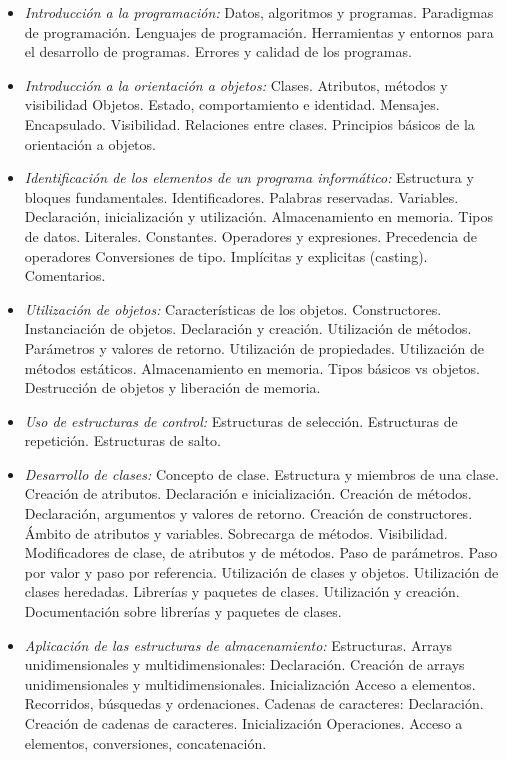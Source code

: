 \begin{itemize}[itemsep=0.1em, topsep=0.1em]
\item\emph{Introducción a la programación:}
Datos, algoritmos y programas.
Paradigmas de programación.
Lenguajes de programación.
Herramientas y entornos para el desarrollo de programas.
Errores y calidad de los programas.
\item\emph{Introducción a la orientación a objetos:}
Clases. Atributos, métodos y visibilidad
Objetos. Estado, comportamiento e identidad. Mensajes.
Encapsulado. Visibilidad.
Relaciones entre clases.
Principios básicos de la orientación a objetos.
\item\emph{Identificación de los elementos de un programa informático:}
Estructura y bloques fundamentales.
Identificadores.
Palabras reservadas.
Variables. Declaración, inicialización y utilización. Almacenamiento en memoria.
Tipos de datos.
Literales.
Constantes.
Operadores y expresiones. Precedencia de operadores
Conversiones de tipo. Implícitas y explicitas (casting).
Comentarios.
\item\emph{Utilización de objetos:}
Características de los objetos.
Constructores.
Instanciación de objetos. Declaración y creación.
Utilización de métodos. Parámetros y valores de retorno.
Utilización de propiedades.
Utilización de métodos estáticos.
Almacenamiento en memoria. Tipos básicos vs objetos.
Destrucción de objetos y liberación de memoria.
\item\emph{Uso de estructuras de control:}
Estructuras de selección.
Estructuras de repetición.
Estructuras de salto.
\item\emph{Desarrollo de clases:}
Concepto de clase.
Estructura y miembros de una clase.
Creación de atributos. Declaración e inicialización.
Creación de métodos. Declaración, argumentos y valores de retorno.
Creación de constructores.
Ámbito de atributos y variables.
Sobrecarga de métodos.
Visibilidad. Modificadores de clase, de atributos y de métodos.
Paso de parámetros. Paso por valor y paso por referencia.
Utilización de clases y objetos.
Utilización de clases heredadas.
Librerías y paquetes de clases. Utilización y creación.
Documentación sobre librerías y paquetes de clases.
\item\emph{Aplicación de las estructuras de almacenamiento:}
Estructuras.
Arrays unidimensionales y multidimensionales:  Declaración.  Creación de arrays unidimensionales y multidimensionales.  Inicialización  Acceso a elementos.  Recorridos, búsquedas y ordenaciones.
Cadenas de caracteres: Declaración.  Creación de cadenas de caracteres.  Inicialización Operaciones. Acceso a elementos, conversiones, concatenación.

\end{itemize}
